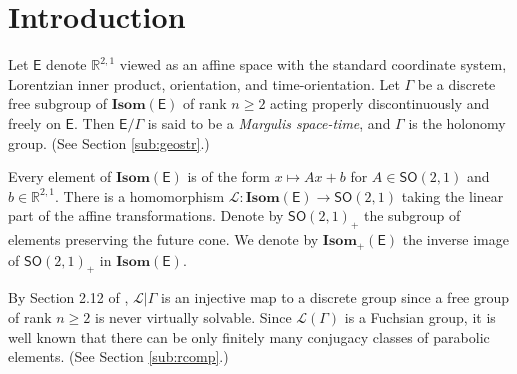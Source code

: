 \documentclass{amsart}
\numberwithin{equation}{section}
\newcommand\bR{{\mathbb{R}}}
\newcommand\ra{\rightarrow}
\newcommand\Isom{{\mathbf{Isom}}}
\newcommand\SO{{\mathsf{SO}}}
\newcommand\Lspace{\mathsf E}
\theoremstyle{definition}
\theoremstyle{remark}
\begin{document}




\date{\today}

\maketitle 




\section{Introduction} 
Let $\Lspace$ denote $\bR^{2, 1}$ viewed as an affine space 
with the standard coordinate system, 
Lorentzian inner product, orientation, and time-orientation. 
Let $\Gamma$ be a discrete free subgroup of $\Isom(\Lspace)$ of rank $n\geq 2$ acting properly discontinuously and freely on $\Lspace$. 
Then $\Lspace/\Gamma$ is said to be a {\em Margulis space-time}, and 
$\Gamma$ is the holonomy group. (See Section \ref{sub:geostr}.)

Every element of $\Isom(\Lspace)$ is of the form $x \mapsto Ax + b$ for $A \in \SO(2, 1)$ and $b\in \bR^{2, 1}$. 
There is a homomorphism $\mathcal{L}:\Isom(\Lspace) \ra \SO(2, 1)$ taking the linear part of the affine transformations. 
Denote by $\SO(2, 1)_+$ the subgroup of elements preserving the future cone. 
We denote by $\Isom_+(\Lspace)$ the inverse image of $\SO(2, 1)_+$ in $\Isom(\Lspace)$.

By Section 2.12 of \cite{FG83}, $\mathcal{L}|\Gamma$ is an injective map
to a discrete group since a free group of rank $n\geq 2$ is never virtually solvable. 
Since $\mathcal{L}(\Gamma)$ is a Fuchsian group, it is well known that 
there can be only finitely many conjugacy classes of parabolic elements. 
(See Section \ref{sub:rcomp}.)

\end{document}
